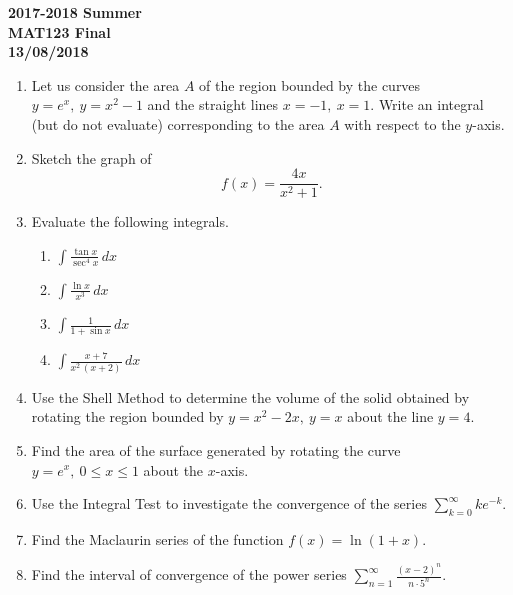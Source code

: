 \documentclass[a4paper, 12pt]{article}
\begin{document}
\newpage
{}
{}

\begin{center}
\textbf{2017-2018 Summer\\MAT123 Final\\13/08/2018}
\end{center}

\begin{enumerate}[leftmargin=*,label=\textbf{\arabic*.}]
\item Let us consider the area $A$ of the region bounded by the curves $y= e^x,\:y=x^2-1$ and the straight lines $x=-1,\:x=1$. Write an integral (but do not evaluate) corresponding to the area $A$ with respect to the $y$-axis.

\item Sketch the graph of
\[f(x)=\frac{4x}{x^2+1}.\]

\item Evaluate the following integrals.

\begin{enumerate}[leftmargin=*,label=\textbf{\alph*.}]
\item $\displaystyle\int\frac{\tan x}{\sec^4x}\,dx$
\item $\displaystyle\int\frac{\ln x}{x^3}\,dx$
\item $\displaystyle\int\frac1{1+\sin x}\,dx$
\item $\displaystyle\int\frac{x+7}{x^2\,(x+2)}\,dx$
\end{enumerate}

\item Use the Shell Method to determine the volume of the solid obtained by rotating the region bounded by $y=x^2-2x,\:y=x$ about the line $y=4$.

\item Find the area of the surface generated by rotating the curve $y= e^x,\:0\leq x\leq1$ about the $x$-axis.

\item Use the Integral Test to investigate the convergence of the series $\displaystyle\sum_{k=0}^{\infty}k e^{-k}$.

\item Find the Maclaurin series of the function $f(x)=\ln(1+x)$.

\item Find the interval of convergence of the power series $\displaystyle\sum_{n=1}^{\infty}\frac{(x-2)^n}{n\cdot 5^n}$.
\end{enumerate}
\end{document}
